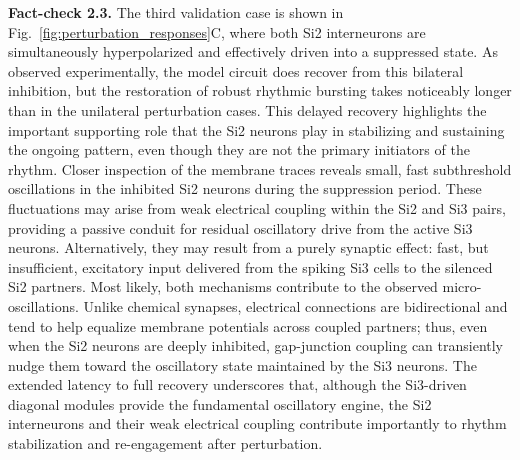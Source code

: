 \documentclass[nofootinbib,aip,amsmath,amssymb,reprint,twocolumn,10pt]{revtex4-2}
\begin{document}
{\bf Fact-check 2.3.} The third validation case is shown in Fig.~\ref{fig:perturbation_responses}C, where both Si2 interneurons are simultaneously hyperpolarized and effectively driven into a suppressed state. As observed experimentally, the model circuit does recover from this bilateral inhibition, but the restoration of robust rhythmic bursting takes noticeably longer than in the unilateral perturbation cases. This delayed recovery highlights the important supporting role that the Si2 neurons play in stabilizing and sustaining the ongoing pattern, even though they are not the primary initiators of the rhythm.
Closer inspection of the membrane traces reveals small, fast subthreshold oscillations in the inhibited Si2 neurons during the suppression period. These fluctuations may arise from weak electrical coupling within the Si2 and Si3 pairs, providing a passive conduit for residual oscillatory drive from the active Si3 neurons. Alternatively, they may result from a purely synaptic effect: fast, but insufficient, excitatory input delivered from the spiking Si3 cells to the silenced Si2 partners. Most likely, both mechanisms contribute to the observed micro-oscillations. Unlike chemical synapses, electrical connections are bidirectional and tend to help equalize membrane potentials across coupled partners; thus, even when the Si2 neurons are deeply inhibited, gap-junction coupling can transiently nudge them toward the oscillatory state maintained by the Si3 neurons. The extended latency to full recovery underscores that, although the Si3-driven diagonal modules provide the fundamental oscillatory engine, the Si2 interneurons and their weak electrical coupling contribute importantly to rhythm stabilization and re-engagement after perturbation.
\end{document}
